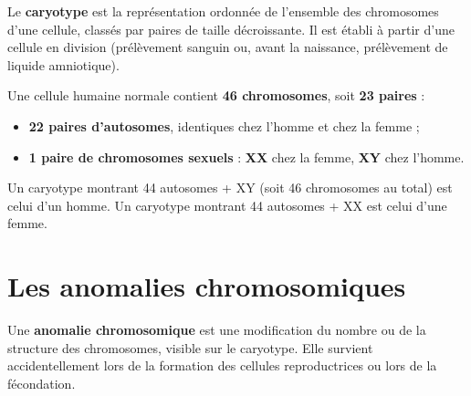\begin{definition}[Caryotype]
Le \textbf{caryotype} est la représentation ordonnée de l'ensemble des chromosomes
d'une cellule, classés par paires de taille décroissante. Il est établi à partir d'une
cellule en division (prélèvement sanguin ou, avant la naissance, prélèvement de
liquide amniotique).
\end{definition}

\begin{propriete}
Une cellule humaine normale contient \textbf{46 chromosomes}, soit \textbf{23 paires} :
\begin{itemize}
\item \textbf{22 paires d'autosomes}, identiques chez l'homme et chez la femme ;
\item \textbf{1 paire de chromosomes sexuels} : \textbf{XX} chez la femme, \textbf{XY}
chez l'homme.
\end{itemize}
\end{propriete}

\begin{illus}
\end{illus}

\begin{exemple}
Un caryotype montrant 44 autosomes + XY (soit 46 chromosomes au total) est celui d'un
homme. Un caryotype montrant 44 autosomes + XX est celui d'une femme.
\end{exemple}

\section{Les anomalies chromosomiques}

\begin{definition}
Une \textbf{anomalie chromosomique} est une modification du nombre ou de la structure
des chromosomes, visible sur le caryotype. Elle survient accidentellement lors de la
formation des cellules reproductrices ou lors de la fécondation.
\end{definition}

